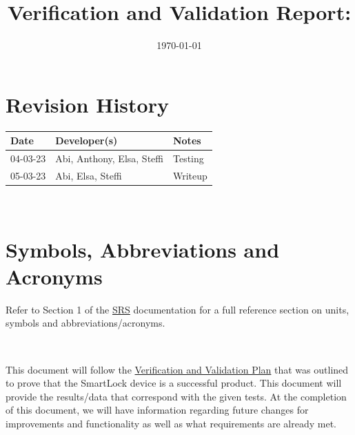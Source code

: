 \documentclass[12pt, titlepage]{article}
\begin{document}
\title{Verification and Validation Report: \progname} 
\author{\authname}
\date{\today}
	
\maketitle


\section{Revision History}

\begin{tabularx}{\textwidth}{p{2cm}p{5cm}X}
\toprule {\bf Date} & {\bf Developer(s)} & {\bf Notes}\\
\midrule
04-03-23& Abi, Anthony, Elsa, Steffi & Testing\\
05-03-23& Abi, Elsa, Steffi & Writeup\\
\bottomrule
\end{tabularx}

~\newpage

\section{Symbols, Abbreviations and Acronyms}

Refer to Section 1 of the \href{https://github.com/NevoAbigail/Capstone/blob/main/docs/SRS/SRS.pdf}{SRS} documentation for a full reference section on units, symbols and abbreviations/acronyms.

\-\



\newpage

\tableofcontents

\listoftables %

\listoffigures %

\newpage


This document will follow the \href{https://github.com/NevoAbigail/Capstone/blob/main/docs/VnVPlan/VnVPlan.pdf}{Verification and Validation Plan} that was outlined to prove that the SmartLock device is a successful product. This document will provide the results/data that correspond with the given tests. At the completion of this document, we will have information regarding future changes for improvements and functionality as well as what requirements are already met. 
\end{document}
